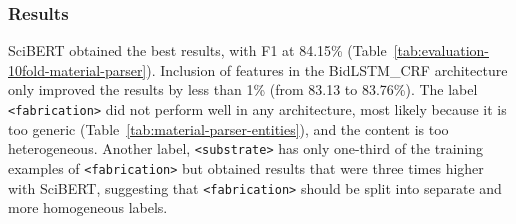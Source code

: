 \subsubsection{Results}

SciBERT obtained the best results, with F1 at 84.15\% (Table~\ref{tab:evaluation-10fold-material-parser}).
Inclusion of features in the BidLSTM\_CRF architecture only improved the results by less than 1\% (from 83.13 to 83.76\%).
The label \texttt{<fabrication>} did not perform well in any architecture, most likely because it is too generic (Table~\ref{tab:material-parser-entities}), and the content is too heterogeneous. Another label, \texttt{<substrate>} has only one-third of the training examples of \texttt{<fabrication>} but obtained results that were three times higher with SciBERT, suggesting that \texttt{<fabrication>} should be split into separate and more homogeneous labels.

